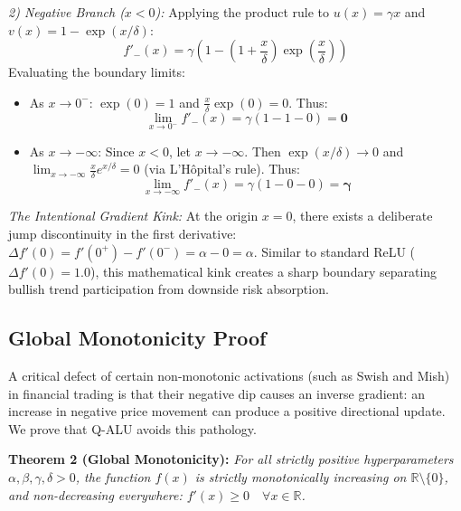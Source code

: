 \documentclass[conference]{IEEEtran}
\begin{document}
\textit{2) Negative Branch ($x < 0$):}
Applying the product rule to $u(x) = \gamma x$ and $v(x) = 1 - \exp(x/\delta)$:
\begin{equation}
f'_-(x) = \gamma \left( 1 - \left(1 + \frac{x}{\delta}\right)\exp\left(\frac{x}{\delta}\right) \right)
\end{equation}
Evaluating the boundary limits:
\begin{itemize}
    \item As $x \to 0^-$: $\exp(0) = 1$ and $\frac{x}{\delta}\exp(0) = 0$. Thus:
    \begin{equation}
    \lim_{x \to 0^-} f'_-(x) = \gamma(1 - 1 - 0) = \mathbf{0}
    \end{equation}
    \item As $x \to -\infty$: Since $x < 0$, let $x \to -\infty$. Then $\exp(x/\delta) \to 0$ and $\lim_{x \to -\infty} \frac{x}{\delta} e^{x/\delta} = 0$ (via L'H\^opital's rule). Thus:
    \begin{equation}
    \lim_{x \to -\infty} f'_-(x) = \gamma(1 - 0 - 0) = \mathbf{\gamma}
    \end{equation}
\end{itemize}

\textit{The Intentional Gradient Kink:} At the origin $x = 0$, there exists a deliberate jump discontinuity in the first derivative: $\Delta f'(0) = f'(0^+) - f'(0^-) = \alpha - 0 = \alpha$. Similar to standard ReLU ($\Delta f'(0) = 1.0$), this mathematical kink creates a sharp boundary separating bullish trend participation from downside risk absorption.

\subsection{Global Monotonicity Proof}
A critical defect of certain non-monotonic activations (such as Swish and Mish) in financial trading is that their negative dip causes an inverse gradient: an increase in negative price movement can produce a positive directional update. We prove that Q-ALU avoids this pathology.

\textbf{Theorem 2 (Global Monotonicity):} \textit{For all strictly positive hyperparameters $\alpha, \beta, \gamma, \delta > 0$, the function $f(x)$ is strictly monotonically increasing on $\mathbb{R} \setminus \{0\}$, and non-decreasing everywhere: $f'(x) \ge 0 \quad \forall x \in \mathbb{R}$.}
\end{document}
